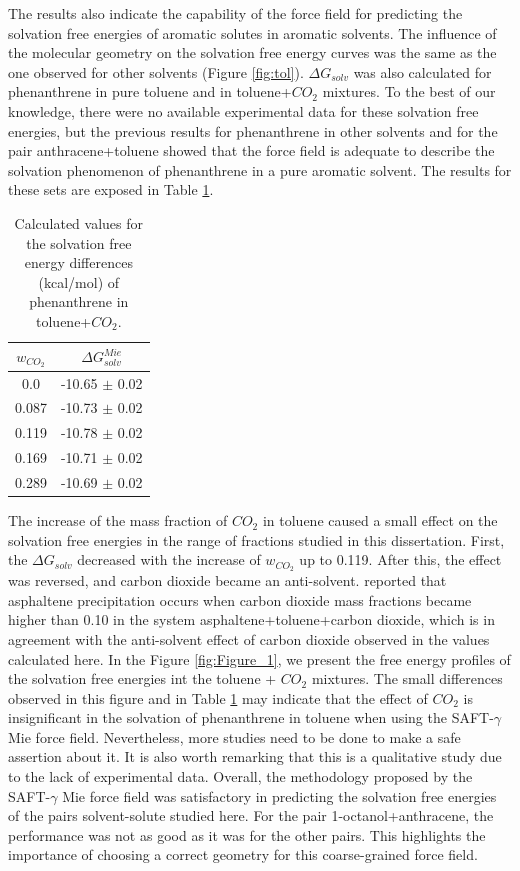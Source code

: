  The results also indicate the capability of the force field for predicting the solvation free energies of aromatic solutes in aromatic solvents. The influence of the molecular geometry on the solvation free energy curves was the same as the one observed for other solvents (Figure \ref{fig:tol}). $\Delta G_{solv}$ was also calculated for phenanthrene in pure toluene and in toluene+$CO_{2}$ mixtures. To the best of our knowledge, there were no available experimental data for these solvation free energies, but the previous results for phenanthrene in other solvents and for the pair anthracene+toluene showed that the force field is adequate to describe the solvation phenomenon of phenanthrene in a pure aromatic solvent. The results for these sets are exposed in Table \ref{tbl:solvco2}.  
 
\FloatBarrier
\begin{table}[H]
\centering
  \caption{Calculated values for the solvation free energy differences (kcal/mol) of phenanthrene in toluene+$CO_{2}$.}
  \label{tbl:solvco2}
  \begin{tabular}{cc}
    \hline
    \hline
      $w_{CO_{2}}$ & $\Delta G_{solv}^{Mie}$ \\
    \hline\hline
    0.0    & -10.65 $\pm$ 0.02   \\
    0.087  & -10.73 $\pm$ 0.02   \\
    0.119  & -10.78 $\pm$ 0.02   \\
    0.169  & -10.71 $\pm$ 0.02   \\
    0.289  & -10.69 $\pm$ 0.02   \\
    \hline
    \hline
  \end{tabular}
\end{table}
\FloatBarrier

The increase of the mass fraction of $CO_{2}$ in toluene caused a small effect on the solvation free energies in the range of fractions studied in this dissertation. First, the $\Delta G_{solv}$ decreased with the increase of $w_{CO_{2}}$ up to 0.119. After this, the effect was reversed, and carbon dioxide became an anti-solvent.  reported that asphaltene precipitation occurs when carbon dioxide mass fractions became higher than 0.10 in the system asphaltene+toluene+carbon dioxide, which is in agreement with the anti-solvent effect of carbon dioxide observed in the values calculated here. In the Figure \ref{fig:Figure_1}, we present the free energy profiles of the solvation free energies int the toluene + $CO_{2}$ mixtures. The small differences observed in this figure and in Table \ref{tbl:solvco2} may indicate that the effect of $CO_{2}$ is insignificant in the solvation of phenanthrene in toluene when using the SAFT-$\gamma$ Mie force field. Nevertheless, more studies need to be done to make a safe assertion about it. It is also worth remarking that this is a qualitative study due to the lack of experimental data. Overall, the methodology proposed by the SAFT-$\gamma$ Mie force field was satisfactory in predicting the solvation free energies of the pairs solvent-solute studied here. For the pair 1-octanol+anthracene, the performance was not as good as it was for the other pairs. This highlights the importance of choosing a correct geometry for this coarse-grained force field.    

